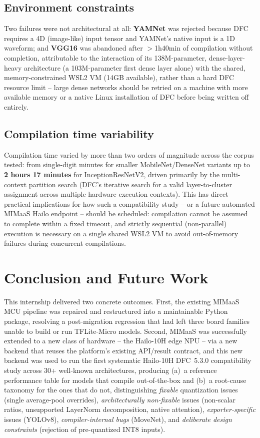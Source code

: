\documentclass[11pt]{article}
\begin{document}
\subsection{Environment constraints}

Two failures were not architectural at all: \textbf{YAMNet} was rejected
because DFC requires a 4D (image-like) input tensor and YAMNet's native input
is a 1D waveform; and \textbf{VGG16} was abandoned after $>$1h40min of
compilation without completion, attributable to the interaction of its
138M-parameter, dense-layer-heavy architecture (a 103M-parameter first dense
layer alone) with the shared, memory-constrained WSL2 VM (14GB available),
rather than a hard DFC resource limit -- large dense networks should be
retried on a machine with more available memory or a native Linux
installation of DFC before being written off entirely.

\subsection{Compilation time variability}

Compilation time varied by more than two orders of magnitude across the
corpus tested: from single-digit minutes for smaller MobileNet/DenseNet
variants up to \textbf{2 hours 17 minutes} for InceptionResNetV2, driven
primarily by the multi-context partition search (DFC's iterative search for
a valid layer-to-cluster assignment across multiple hardware execution
contexts). This has direct practical implications for how such a
compatibility study -- or a future automated MIMaaS Hailo endpoint -- should
be scheduled: compilation cannot be assumed to complete within a fixed
timeout, and strictly sequential (non-parallel) execution is necessary on a
single shared WSL2 VM to avoid out-of-memory failures during concurrent
compilations.

\section{Conclusion and Future Work}

This internship delivered two concrete outcomes. First, the existing
MIMaaS MCU pipeline was repaired and restructured into a maintainable Python
package, resolving a post-migration regression that had left three board
families unable to build or run TFLite-Micro models. Second, MIMaaS was
successfully extended to a new class of hardware -- the Hailo-10H edge NPU --
via a new backend that reuses the platform's existing API/result contract,
and this new backend was used to run the first systematic Hailo-10H DFC~5.3.0
compatibility study across 30+ well-known architectures, producing (a)~a
reference performance table for models that compile out-of-the-box and
(b)~a root-cause taxonomy for the ones that do not, distinguishing
\emph{fixable} quantization issues (single average-pool overrides),
\emph{architecturally non-fixable} issues (non-scalar ratios, unsupported
LayerNorm decomposition, native attention), \emph{exporter-specific} issues
(YOLOv8), \emph{compiler-internal bugs} (MoveNet), and \emph{deliberate
design constraints} (rejection of pre-quantized INT8 inputs).
\end{document}
